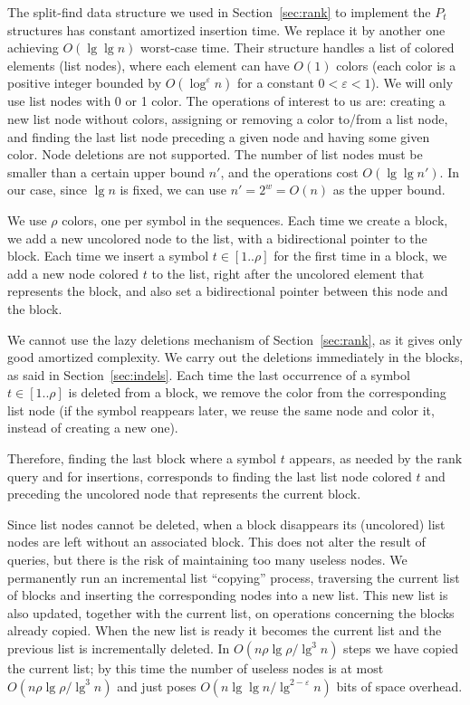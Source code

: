 \documentclass[11pt]{article}
\def\idrm#1{\ensuremath{\mathrm{#1}}}
\newcommand{\ra}{\idrm{rank}}
\newcommand{\eps}{\varepsilon}
\begin{document}
The split-find data structure \cite{IA84} we used in Section~\ref{sec:rank}
to implement the $P_t$ structures has constant amortized insertion time. We
replace it by  another one \cite[Thm 4.1]{Mor03} achieving $O(\lg\lg n)$
worst-case time. Their structure handles a list of colored elements (list nodes), where
each element can have $O(1)$ colors (each color is a positive integer bounded by $O(\log^{\eps} n)$ for a constant $0<\eps<1$). 
We will only use list nodes with 0 or 1 color.
The operations of interest to us are: creating a new list node without colors, 
assigning or removing a color to/from a list node, and finding the last list node 
preceding a given node and having some given color. Node deletions are not
supported. The number of list nodes must be smaller than a certain upper bound $n'$,
and the operations cost $O(\lg\lg n')$. In our case, since $\lg n$ is fixed,
we can use $n'=2^w=O(n)$ as the upper bound.

We use $\rho$ colors, one per symbol in the sequences. Each time we create
a block, we add a new uncolored node to the list, with a 
bidirectional pointer to the block. Each time we insert a symbol
$t \in [1..\rho]$ for the first time in a block, we add a new node colored
$t$ to the list, right after the uncolored element that represents the block,
and also set a bidirectional pointer between this node and the block.

We cannot use the lazy deletions mechanism of Section~\ref{sec:rank}, as it
gives only good amortized complexity. We carry out the deletions immediately
in the blocks, as said in Section~\ref{sec:indels}.
Each time the last occurrence of a symbol $t \in [1..\rho]$ is deleted from a
block, we remove the color from the corresponding list node (if the symbol reappears
later, we reuse the same node and color it, instead of creating a new one). 

Therefore, finding
the last block where a symbol $t$ appears, as needed by the $\ra$ query and
for insertions, corresponds to finding the last list node colored $t$ and
preceding the uncolored node that represents the current block.

Since list nodes cannot be deleted, when a block disappears its (uncolored)
list nodes are left without an associated block. This does not alter the result
of queries, but there is the risk of maintaining too many
useless nodes. We permanently run an incremental list
``copying'' process, traversing the current list of blocks and inserting the
corresponding nodes into a new list. This new list is also updated, together
with the current list, on operations concerning the blocks already copied.
When the new list is ready it becomes
the current list and the previous list is incrementally deleted. In
$O(n\rho\lg\rho/\lg^3 n)$ steps we have copied the current list; by this time the
number of useless nodes is at most $O(n\rho\lg\rho/\lg^3 n)$ and just poses 
$O(n\lg\lg n/\lg^{2-\eps}n)$ bits of space overhead.
\end{document}
